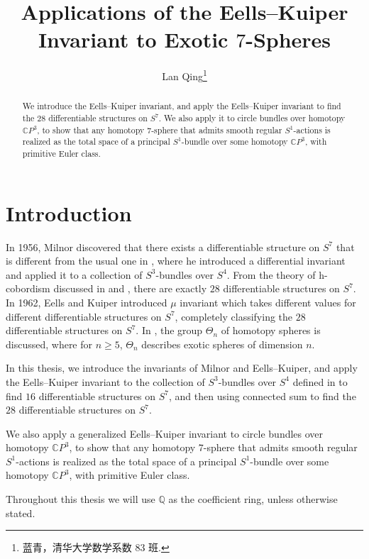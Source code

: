 \documentclass[twoside]{article}
\begin{document}
\title{Applications of the Eells--Kuiper Invariant to Exotic $7$-Spheres}
\author{Lan Qing\footnote{蓝青，清华大学数学系数 83 班.}}

\begin{abstract}
	We introduce the Eells--Kuiper invariant, and apply the Eells--Kuiper invariant to find the $28$ differentiable structures on $S^7$. We also apply it to circle bundles over homotopy $\mathbb{C}P^3$, to show that any homotopy $7$-sphere that admits smooth regular $S^1$-actions
	is realized as the total space of a principal $S^1$-bundle over some homotopy $\mathbb{C}P^3$, with primitive Euler class. 
\end{abstract}

\tableofcontents

\section{Introduction}

In 1956, Milnor discovered that there exists a differentiable structure on $S^7$ that is different from the usual one in \cite{milnor7sphere}, where he introduced a differential  invariant and applied it to a collection of $S^3$-bundles over $S^4$. From the theory of h-cobordism discussed in \cite{milnor3} and \cite{smale}, there are exactly $28$ differentiable structures on $S^7$. In 1962, Eells and Kuiper introduced $\mu$ invariant which takes different values for different differentiable structures on $S^7$, completely classifying the $28$ differentiable structures on $S^7$. 
In \cite{kervairemilnor}, the group $\Theta_n$ of homotopy  spheres is discussed, where for  $n \geq  5$, $\Theta_n$ describes exotic spheres of dimension $n$. 

In this thesis, we introduce the invariants of Milnor and Eells--Kuiper, and apply the Eells--Kuiper invariant to the collection of $S^3$-bundles over $S^4$ defined in \cite{milnor7sphere} to find $16$ differentiable structures on $S^7$, and then using connected sum to find the $28$ differentiable structures on $S^7$. 

We also apply a generalized Eells--Kuiper invariant to circle bundles over homotopy $\mathbb{C}P^3$, to show that any homotopy $7$-sphere that admits smooth regular $S^1$-actions
is realized as the total space of a principal $S^1$-bundle over some homotopy $\mathbb{C}P^3$, with primitive Euler class. 

Throughout this thesis we will use $\mathbb{Q}$ as the coefficient ring, unless otherwise stated. 
\end{document}
